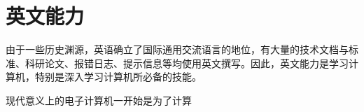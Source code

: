 \section{英文能力}\label{sec:Preclass/english}
    由于一些历史渊源，英语确立了国际通用交流语言的地位，有大量的技术文档与标准、科研论文、报错日志、提示信息等均使用英文撰写。因此，英文能力是学习计算机，特别是深入学习计算机所必备的技能。
    \begin{displayquote}
        现代意义上的电子计算机一开始是为了计算
    \end{displayquote}
